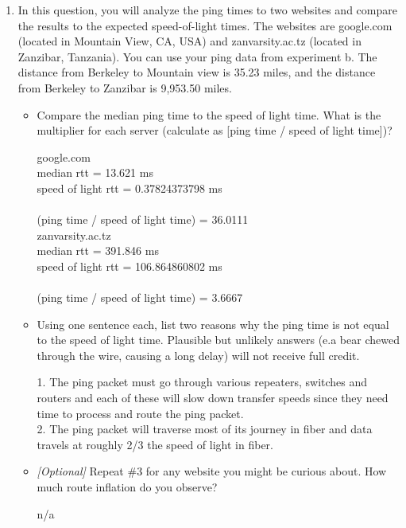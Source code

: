 \documentclass[10pt]{article}
\begin{document}
\begin{enumerate}
\item In this question, you will analyze the ping times to two websites and compare the results to the expected speed-of-light times. The websites are google.com (located in Mountain View, CA, USA) and zanvarsity.ac.tz (located in Zanzibar, Tanzania). You can use your ping data from experiment b. The distance from Berkeley to Mountain view is 35.23 miles, and the distance from Berkeley to Zanzibar is 9,953.50 miles.

\begin{itemize}

\item Compare the median ping time to the speed of light time. What is the multiplier for each server (calculate as [ping time / speed of light time])?

google.com \\
median rtt = 13.621 ms \\
speed of light rtt = 0.37824373798 ms \\
\\
(ping time / speed of light time) = 36.0111 \\

zanvarsity.ac.tz \\
median rtt = 391.846 ms \\
speed of light rtt = 106.864860802 ms \\
\\
(ping time / speed of light time) = 3.6667

\item Using one sentence each, list two reasons why the ping time is not equal to the speed of light time. Plausible but unlikely answers (e.a bear chewed through the wire, causing a long delay) will not receive full credit.

1. The ping packet must go through various repeaters, switches and routers and each of these will slow down transfer speeds since they need time to process and route the ping packet.
\\
2. The ping packet will traverse most of its journey in fiber and data travels at roughly 2/3 the speed of light in fiber.


\item \emph{[Optional]} Repeat \#3 for any website you might be curious about. How much route inflation do you observe?

n/a

\end{itemize}
\end{enumerate}
\end{document}

